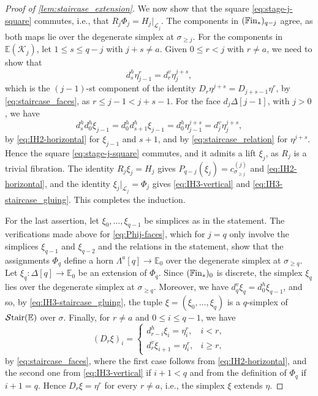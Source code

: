 \documentclass[10pt,reqno]{amsart}
\begin{document}
\begin{proof}[Proof of \cref{lem:staircase_extension}]
We now show that the square \eqref{eq:stage-j-square} commutes, i.e.,
that $R_j\Phi_j=H_j|_{\mathcal L_j}$. The components in
$(\mathbb{F}\mathrm{in}_*)_{q-j}$ agree, as both maps lie over the degenerate
simplex at $\sigma_{\geq j}$. For the components in
$\mathbb E(\mathcal K_j)$, let $1\le s\le q-j$ with $j+s\ne a$.
Given $0\le r<j$ with $r\ne a$, we need to show that
\[
  d_s^h\eta^r_{j-1}=d_r^v\eta^{j+s}_j,
\]
which is the $(j-1)$-st component of the identity
$D_r\eta^{j+s}=D_{j+s-1}\eta^r$, by \eqref{eq:staircase_faces}, as
$r\leq j-1<j+s-1$. For the face $d_j\Delta[j-1]$, with $j>0$, we
have
\[
  d_s^hd_0^h\xi_{j-1}
  =d_0^hd_{s+1}^h\xi_{j-1}
  =d_0^h\eta^{j+s}_{j-1}
  =d_j^v\eta^{j+s}_j,
\]
by \eqref{eq:IH2-horizontal} for $\xi_{j-1}$ and $s+1$, and by
\eqref{eq:staircase_relation} for $\eta^{j+s}$. Hence the square
\eqref{eq:stage-j-square} commutes, and it admits a lift $\xi_j$, as
$R_j$ is a trivial fibration. The identity $R_j\xi_j=H_j$ gives
$P_{q-j}(\xi_j)=c_{\sigma_{\geq j}}^{(j)}$ and
\eqref{eq:IH2-horizontal}, and the identity
$\xi_j|_{\mathcal L_j}=\Phi_j$ gives \eqref{eq:IH3-vertical} and
\eqref{eq:IH3-staircase_gluing}. This completes the induction.

For the last assertion, let $\xi_0,\ldots,\xi_{q-1}$ be simplices as
in the statement. The verifications made above for
\eqref{eq:Phij-faces}, which for $j=q$ only involve the simplices
$\xi_{q-1}$ and $\xi_{q-2}$ and the relations in the statement,
show that the assignments $\Phi_q$ define a horn
$\Lambda^a[q]\to\mathbb E_0$ over the degenerate simplex at
$\sigma_{\geq q}$. Let $\xi_q:\Delta[q]\to\mathbb E_0$ be an
extension of $\Phi_q$. Since $(\mathbb{F}\mathrm{in}_*)_0$ is discrete, the
simplex $\xi_q$ lies over the degenerate simplex at
$\sigma_{\geq q}$. Moreover, we have
$d_q^v\xi_q=d_0^h\xi_{q-1}$, and so, by
\eqref{eq:IH3-staircase_gluing}, the tuple
$\xi=(\xi_0,\ldots,\xi_q)$ is a $q$-simplex of
$\mathcal{S}\mathrm{tair}(\mathbb E)$ over $\sigma$. Finally, for $r\ne a$ and
$0\le i\le q-1$, we have
\begin{equation}\label{eq:total-faces-of-filler}
  (D_r\xi)_i=
  \begin{cases}
    d_{r-i}^h\xi_i=\eta^r_i, & i<r,\\[1mm]
    d_r^v\xi_{i+1}=\eta^r_i, & i\ge r,
  \end{cases}
\end{equation}
by \eqref{eq:staircase_faces}, where the first case follows from
\eqref{eq:IH2-horizontal}, and the second one from
\eqref{eq:IH3-vertical} if $i+1<q$ and from the definition of
$\Phi_q$ if $i+1=q$. Hence $D_r\xi=\eta^r$ for every
$r\ne a$, i.e., the simplex $\xi$ extends $\eta$.
\end{proof}




\end{document}
